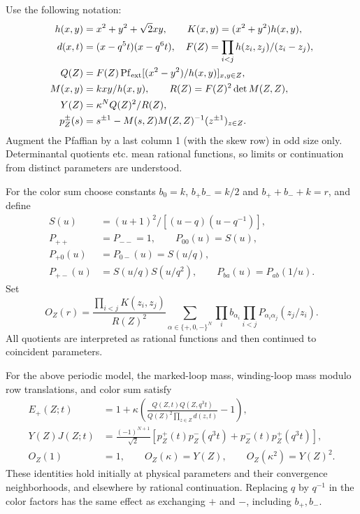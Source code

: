 Use the following notation:
\[
 \begin{aligned}
 h(x,y)&=x^2+y^2+\sqrt2 xy,\qquad K(x,y)=(x^2+y^2)h(x,y),\\
 d(x,t)&=(x-q^5t)(x-q^6t),\quad
 F(Z)=\prod_{i<j} h(z_i,z_j)/(z_i-z_j),\\
 Q(Z)&=F(Z)\operatorname{Pf}_{\rm ext}[(x^2-y^2)/h(x,y)]_{x,y\in Z},\\
 M(x,y)&=kxy/h(x,y),\qquad R(Z)=F(Z)^2\det M(Z,Z),\\
 Y(Z)&=\kappa^N Q(Z)^2/R(Z),\\
 p_Z^\pm(s)&=s^{\pm1}-M(s,Z) M(Z,Z)^{-1}(z^{\pm1})_{z\in Z}.
 \end{aligned}
\]
Augment the Pfaffian by a last column 1 (with the skew row) in odd size only. Determinantal quotients etc. mean rational functions, so limits or continuation from distinct parameters are understood.

For the color sum choose constants $b_0=k$, $b_+b_-=k/2$ and
$b_++b_-+k=r$, and define
\[
\begin{aligned}
 S(u)&=(u+1)^2/[(u-q)(u-q^{-1})],\\
 P_{++}&=P_{--}=1,\qquad P_{00}(u)=S(u),\\
 P_{+0}(u)&=P_{0-}(u)=S(u/q),\\
 P_{+-}(u)&=S(u/q)S(u/q^2),\qquad P_{ba}(u)=P_{ab}(1/u).
\end{aligned}
\]
Set
\begin{equation}\label{L:eq:color-definition}
 O_Z(r)=\frac{\prod_{i<j}K(z_i,z_j)}{R(Z)^2}
 \sum_{\alpha\in\{+,0,-\}^N}
 \prod_i b_{\alpha_i}\prod_{i<j}P_{\alpha_i\alpha_j}(z_j/z_i).
\end{equation}
All quotients are interpreted as rational functions and then continued to
coincident parameters.

\begin{proposition}\label{L:prop:periodic}
For the above periodic model, the marked-loop mass, winding-loop mass
modulo row translations, and color sum satisfy
\begin{align}
 E_+(Z;t)&=1+\kappa\left(\frac{Q(Z,t)Q(Z,q^3t)}
 {Q(Z)^2\prod_{z\in Z}d(z,t)}-1\right),\label{L:eq:one-port}\\
 Y(Z)J(Z;t)&=\frac{(-1)^{N+1}}{\sqrt2}
 [p_Z^+(t)p_Z^-(q^3t)+p_Z^-(t)p_Z^+(q^3t)],\label{L:eq:winding}\\
 O_Z(1)&=1,\qquad O_Z(\kappa)=Y(Z),\qquad
 O_Z(\kappa^2)=Y(Z)^2.\label{L:eq:color-values}
\end{align}
These identities hold initially at physical parameters and their
convergence neighborhoods, and elsewhere by rational continuation.
Replacing $q$ by $q^{-1}$ in the color factors has the same effect as
exchanging $+$ and $-$, including $b_+,b_-$.
\end{proposition}

